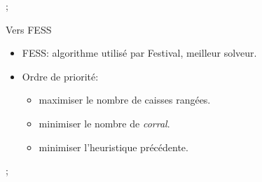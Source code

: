         \begin{interstateframe}
            \begin{interstatenv}{11}{5};\end{interstatenv}
        \end{interstateframe}

        \begin{frame}{Vers FESS}
            \begin{itemize}
                \item FESS: algorithme utilisé par Festival, meilleur solveur.
                \item Ordre de priorité:
                    \begin{itemize}
                        \item maximiser le nombre de caisses rangées.
                        \item minimiser le nombre de \textit{corral}.
                        \item minimiser l'heuristique précédente.
                    \end{itemize}
            \end{itemize}
        \end{frame}

        \begin{interstateframe}
            \begin{interstatenv}{15}{4};\end{interstatenv}
        \end{interstateframe}

